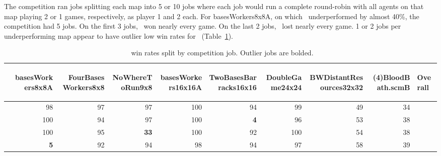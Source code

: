 \documentclass[conference]{IEEEtran}
\newcommand{\mapname}[1]{#1} %
\newcommand{\tablemapname}[1]{#1} %
\begin{document}
The competition ran jobs splitting each map into 5 or 10 jobs where
each job would run a complete round-robin with all agents on that map playing 2 or 1
games, respectively, as player 1 and 2 each. For \mapname{basesWorkers8x8A}, on which \agentName\
underperformed by almost 40\%, the competition had 5 jobs. On the first 3 jobs,
\agentName\ won nearly every game. On the last 2 jobs, \agentName\ lost nearly every
game. 1 or 2 jobs per underperforming map appear to have outlier low win rates
for \agentName\ (Table~\ref{tab:outlier-winrate}).

\begin{table}[t]
    \centering
    \begin{threeparttable}
    \caption{\agentName\ win rates split by competition job. Outlier jobs are bolded.}
    \label{tab:outlier-winrate}
    \begin{tabular}{r|rrrrrrrr|l}
    & \begin{sideways}\tablemapname{basesWorkers8x8A}\end{sideways} &
    \begin{sideways}\tablemapname{FourBasesWorkers8x8}\end{sideways} &
    \begin{sideways}\tablemapname{NoWhereToRun9x8}\end{sideways} &
    \begin{sideways}\tablemapname{basesWorkers16x16A}\end{sideways} &
    \begin{sideways}\tablemapname{TwoBasesBarracks16x16}\end{sideways} &
    \begin{sideways}\tablemapname{DoubleGame24x24}\end{sideways} &
    \begin{sideways}\tablemapname{BWDistantResources32x32}\end{sideways} &
    \begin{sideways}\tablemapname{(4)BloodBath.scmB}\end{sideways} & 
    \begin{sideways}Overall\end{sideways}\\
    \midrule
    & 98 & 97 & 97 & 100 & 94 & 99 & 49 & 34 &  \\
    & 100 & 94 & 97 & 100 & \textbf{4} & 96 & 53 & 38 &  \\
    & 100 & 95 & \textbf{33} & 100 & 92 & 100 & 54 & 38 &  \\
    & \textbf{5} & 92 & 94 & 98 & 94 & 97 & 58 & 39 &  \\

\end{tabular}
\end{threeparttable}
\end{table}
\end{document}
